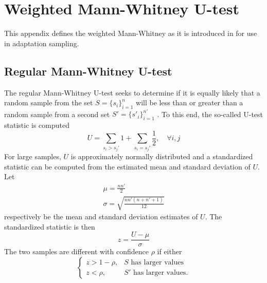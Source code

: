 
\chapter{Weighted Mann-Whitney U-test}\label{app: Weighted Mann-Whitney U-test)}
This appendix defines the weighted Mann-Whitney as it is introduced in \cite{Schaul2011a} for use in adaptation sampling. 

\section{Regular Mann-Whitney U-test}
The regular Mann-Whitney U-test seeks to determine if it is equally likely that a random sample from the set $S=\{s_i\}_{i=1}^{n}$ will be less than or greater than a random sample from a second set $S′=\{s'_i\}_{i=1}^{n'}$ \cite{Mann1947}. To this end, the so-called U-test statistic is computed
\begin{equation}
    U = \sum_{s_i > s_j'} 1 + \sum_{s_i=s_j'} \frac{1}{2},\quad \forall i,j
\end{equation}
For large samples, $U$ is approximately normally distributed and a standardized statistic can be computed from the estimated mean and standard deviation of $U$. Let
\begin{gather}
    \mu = \frac{nn'}{2}\\
    \sigma = \sqrt{\frac{nn'(n+n'+1)}{12}}
\end{gather}
respectively be the mean and standard deviation estimates of $U$. The standardized statistic is then
\begin{equation}
    z = \frac{U-\mu}{\sigma}
\end{equation}
The two samples are different with confidence $\rho$ if either
\begin{equation}
    \begin{cases}
        z > 1-\rho, & S \text{ has larger values}\\
        z < \rho, & S' \text{ has larger values.}
    \end{cases}
\end{equation}


